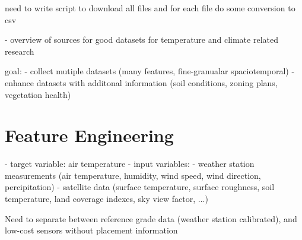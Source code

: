 need to write script to download all files and for each file do some conversion to csv

- overview of sources for good datasets for temperature and climate related research

goal:
- collect mutiple datasets (many features, fine-granualar spaciotemporal)
- enhance datasets with additonal information (soil conditions, zoning plans, vegetation health)


\section{Feature Engineering}

- target variable: air temperature
- input variables:
    - weather station measurements (air temperature, humidity, wind speed, wind direction, percipitation)
    - satellite data (surface temperature, surface roughness, soil temperature, land coverage indexes, sky view factor, ...)

    Need to separate between reference grade data (weather station calibrated), and low-cost sensors without placement information





